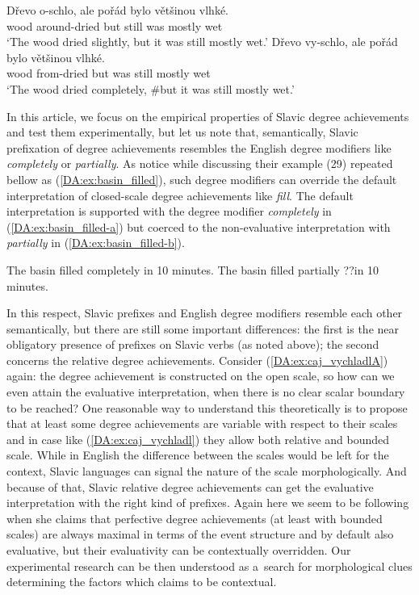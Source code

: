 \documentclass[output=paper]{langscibook}
\begin{document}
\ea\label{DA:ex:drevo}\ea\label{DA:ex:drevo_oschlo} \gll Dřevo o-schlo, ale pořád bylo většinou vlhké. \\
wood around-dried but still was mostly wet \\
\glt ‘The wood dried slightly, but it was still mostly wet.’ 
\ex\label{DA:ex:drevo_vyschlo} \gll Dřevo vy-schlo, \minsp{\#} ale pořád bylo většinou vlhké. \\
wood from-dried {} but was still mostly wet  \\
\glt ‘The wood dried completely, \#but it was still mostly wet.’
\z\z 

\noindent In this article, we focus on the empirical properties of Slavic degree achievements and test them experimentally, but let us note that, semantically, Slavic prefixation of degree achievements resembles the English degree modifiers like \textit{completely} or \textit{partially}. As \citet{kennedy2008measure} notice while discussing their example (29) repeated bellow as (\ref{DA:ex:basin_filled}), such degree modifiers can override the default interpretation of closed-scale degree achievements like \textit{fill}. The default interpretation is supported with the degree modifier \textit{completely} in (\ref{DA:ex:basin_filled-a}) but coerced to the non-evaluative interpretation with \textit{partially} in (\ref{DA:ex:basin_filled-b}). 

\ea\label{DA:ex:basin_filled}\ea\label{DA:ex:basin_filled-a} The basin filled completely in 10 minutes.
\ex\label{DA:ex:basin_filled-b} The basin filled partially ??in 10 minutes.
\z\z

\noindent In this respect, Slavic prefixes and English degree modifiers resemble each other semantically, but there are still some important differences: the first is the near obligatory presence of prefixes on Slavic verbs (as noted above); the second concerns the relative degree achievements. Consider (\ref{DA:ex:caj_vychladlA}) again: the degree achievement is constructed on the open scale, so how can we even attain the evaluative interpretation, when there is no clear scalar boundary to be reached? One reasonable way to understand this theoretically is to propose that at least some degree achievements are variable with respect to their scales and in case like (\ref{DA:ex:caj_vychladl}) they allow both relative and bounded scale. While in English the difference between the scales would be left for the context, Slavic languages can signal the nature of the scale morphologically. And because of that, Slavic relative degree achievements can get the evaluative interpretation with the right kind of prefixes. Again here we seem to be following \citet{Filip2008} when she claims that perfective degree achievements (at least with bounded scales) are always maximal in terms of the event structure and by default also evaluative, but their evaluativity can be contextually overridden. Our experimental research can be then understood as a~search for morphological clues determining the factors which \citet{Filip2008} claims to be contextual. 
\end{document}
